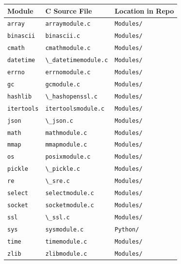 \begin{longtable}[]{@{}lll@{}}
\toprule
Module & C Source File & Location in Repo \\
\midrule
\endhead
\passthrough{\lstinline!array!} &
\passthrough{\lstinline!arraymodule.c!} &
\passthrough{\lstinline!Modules/!} \\
\passthrough{\lstinline!binascii!} &
\passthrough{\lstinline!binascii.c!} &
\passthrough{\lstinline!Modules/!} \\
\passthrough{\lstinline!cmath!} &
\passthrough{\lstinline!cmathmodule.c!} &
\passthrough{\lstinline!Modules/!} \\
\passthrough{\lstinline!datetime!} &
\passthrough{\lstinline!\_datetimemodule.c!} &
\passthrough{\lstinline!Modules/!} \\
\passthrough{\lstinline!errno!} &
\passthrough{\lstinline!errnomodule.c!} &
\passthrough{\lstinline!Modules/!} \\
\passthrough{\lstinline!gc!} & \passthrough{\lstinline!gcmodule.c!} &
\passthrough{\lstinline!Modules/!} \\
\passthrough{\lstinline!hashlib!} &
\passthrough{\lstinline!\_hashopenssl.c!} &
\passthrough{\lstinline!Modules/!} \\
\passthrough{\lstinline!itertools!} &
\passthrough{\lstinline!itertoolsmodule.c!} &
\passthrough{\lstinline!Modules/!} \\
\passthrough{\lstinline!json!} & \passthrough{\lstinline!\_json.c!} &
\passthrough{\lstinline!Modules/!} \\
\passthrough{\lstinline!math!} & \passthrough{\lstinline!mathmodule.c!}
& \passthrough{\lstinline!Modules/!} \\
\passthrough{\lstinline!mmap!} & \passthrough{\lstinline!mmapmodule.c!}
& \passthrough{\lstinline!Modules/!} \\
\passthrough{\lstinline!os!} & \passthrough{\lstinline!posixmodule.c!} &
\passthrough{\lstinline!Modules/!} \\
\passthrough{\lstinline!pickle!} & \passthrough{\lstinline!\_pickle.c!}
& \passthrough{\lstinline!Modules/!} \\
\passthrough{\lstinline!re!} & \passthrough{\lstinline!\_sre.c!} &
\passthrough{\lstinline!Modules/!} \\
\passthrough{\lstinline!select!} &
\passthrough{\lstinline!selectmodule.c!} &
\passthrough{\lstinline!Modules/!} \\
\passthrough{\lstinline!socket!} &
\passthrough{\lstinline!socketmodule.c!} &
\passthrough{\lstinline!Modules/!} \\
\passthrough{\lstinline!ssl!} & \passthrough{\lstinline!\_ssl.c!} &
\passthrough{\lstinline!Modules/!} \\
\passthrough{\lstinline!sys!} & \passthrough{\lstinline!sysmodule.c!} &
\passthrough{\lstinline!Python/!} \\
\passthrough{\lstinline!time!} & \passthrough{\lstinline!timemodule.c!}
& \passthrough{\lstinline!Modules/!} \\
\passthrough{\lstinline!zlib!} & \passthrough{\lstinline!zlibmodule.c!}
& \passthrough{\lstinline!Modules/!} \\
\bottomrule
\end{longtable}

